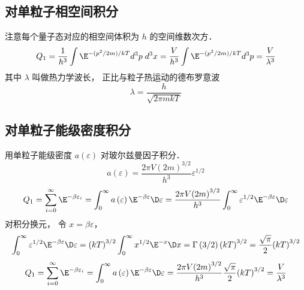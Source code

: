 \subsection{对单粒子相空间积分}
注意每个量子态对应的相空间体积为 $h$ 的空间维数次方．
\begin{equation}
{Q_1} = \frac{1}{{{h^3}}}\int {{\E^{ - ({p^2}/2m)/kT}}{d^3}p\;{d^3}x}  = \frac{V}{{{h^3}}}\int {{\E^{ - ({p^2}/2m)/kT}}{d^3}p}  = \frac{V}{{{\lambda ^3}}}
\end{equation}
其中 $\lambda $ 叫做热力学波长， 正比与粒子热运动的德布罗意波
\begin{equation}
\lambda  = \frac{h}{{\sqrt {2\pi mkT} }}
\end{equation}

\subsection{对单粒子能级密度积分}
用单粒子能级密度 $a\left( \varepsilon  \right)$ 对玻尔兹曼因子积分．
\begin{equation}
    a\left( \varepsilon  \right) = \frac{{2\pi V{{\left( {2m} \right)}^{3/2}}}}{{{h^3}}}{\varepsilon ^{1/2}}
\end{equation}
\begin{equation}
   {Q_1} = \sum\limits_{i = 0}^\infty  {{\E^{ - \beta {\varepsilon _i}}}}  = \int_0^\infty  {a\left( \varepsilon  \right){\E^{ - \beta \varepsilon }}\D \varepsilon }  \\
   = \frac{{2\pi V{{\left( {2m} \right)}^{3/2}}}}{{{h^3}}}\int_0^\infty  {{\varepsilon ^{1/2}}{\E^{ - \beta \varepsilon }}\D \varepsilon }
\end{equation}
  对积分换元， 令 $x = \beta \varepsilon $， 
\begin{equation}
    \int_0^\infty  {{\varepsilon ^{1/2}}{\E^{ - \beta \varepsilon }}\D \varepsilon } = {\left( {kT} \right)^{3/2}}\int_0^\infty  {{x^{1/2}}{\E^{ - x}}\D x}
    = \Gamma \left( {3/2} \right){\left( {kT} \right)^{3/2}}
    = \frac{{\sqrt \pi  }}{2}{\left( {kT} \right)^{3/2}}
\end{equation}
\begin{equation}
{Q_1} = \sum\limits_{i = 0}^\infty  {{\E^{ - \beta {\varepsilon _i}}}}  = \int_0^\infty  {a\left( \varepsilon  \right){\E^{ - \beta \varepsilon }}\D\varepsilon } = \frac{{2\pi V{{\left( {2m} \right)}^{3/2}}}}{{{h^3}}}\frac{{\sqrt \pi  }}{2}{\left( {kT} \right)^{3/2}}  = \frac{V}{{{\lambda ^3}}}
\end{equation}


